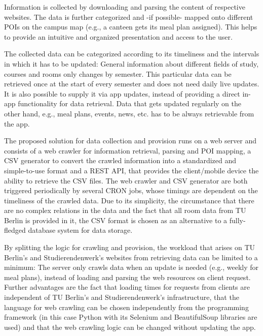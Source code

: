 Information is collected by downloading and parsing the content of respective websites. The data is further categorized and -if possible- mapped onto different POIs on the campus map (e.g., a canteen gets its meal plan assigned). This helps to provide an intuitive and organized presentation and access to the user.

The collected data can be categorized according to its timeliness and the intervals in which it has to be updated: General information about different fields of study, courses and rooms only changes by semester. This particular data can be retrieved once at the start of every semester and does not need daily live updates. It is also possible to supply it via app updates, instead of providing a direct in-app functionality for data retrieval. Data that gets updated regularly on the other hand, e.g., meal plans, events, news, etc. has to be always retrievable from the app.

The proposed solution for data collection and provision runs on a web server and consists of a web crawler for information retrieval, parsing and POI mapping, a CSV generator to convert the crawled information into a standardized and simple-to-use format and a REST API, that provides the client/mobile device the ability to retrieve the CSV files. The web crawler and CSV generator are both triggered periodically by several CRON jobs, whose timings are dependent on the timeliness of the crawled data. Due to its simplicity, the circumstance that there are no complex relations in the data and the fact that all room data from TU Berlin is provided in it, the CSV format is chosen as an alternative to a fully-fledged database system for data storage.

By splitting the logic for crawling and provision, the workload that arises on TU Berlin's and Studierendenwerk's websites from retrieving data can be limited to a minimum: The server only crawls data when an update is needed (e.g., weekly for meal plans), instead of loading and parsing the web resources on client request. Further advantages are the fact that loading times for requests from clients are independent of TU Berlin's and Studierendenwerk's infrastructure, that the language for web crawling can be chosen independently from the programming framework (in this case Python with its Selenium \cite{selenium} and BeautifulSoup \cite{beautifulsoup4} libraries are used) and that the web crawling logic can be changed without updating the app.

